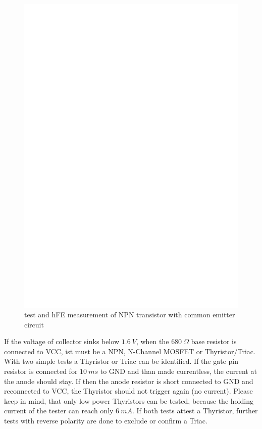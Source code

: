 \begin{figure}[H]
\centering
\includegraphics[]{../FIG/NPNce.eps}
\caption{test and hFE measurement of NPN transistor with common emitter circuit }
\label{fig:npnce}
\end{figure}

If the voltage of collector sinks below \(1.6~V\), when the \(680~\Omega\) base resistor is connected to VCC,
ist must be a NPN, N-Channel MOSFET or Thyristor/Triac.
With two simple tests a Thyristor or Triac can be identified.
If the gate pin resistor is connected for \(10~ms\) to GND and than made currentless, the current
at the anode should stay.
If then the anode resistor is short connected to GND and reconnected to VCC, the Thyristor should not
trigger again (no current).
Please keep in mind, that only low power Thyristors can be tested, because
the holding current of the tester can reach only \(6~mA\).
If both tests attest a Thyristor, further tests with reverse polarity are done
to exclude or confirm a Triac.

